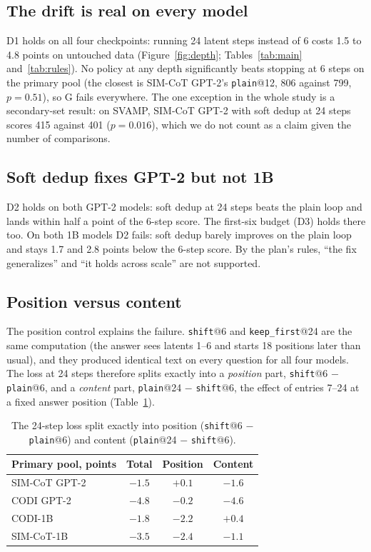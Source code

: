 \documentclass[11pt]{article}
\newcommand{\pol}[1]{\texttt{#1}}
\begin{document}
\subsection{The drift is real on every model}

D1 holds on all four checkpoints: running 24 latent steps instead of 6 costs 1.5 to 4.8 points on untouched data
(Figure~\ref{fig:depth}; Tables~\ref{tab:main} and~\ref{tab:rules}). No policy at any depth significantly beats stopping at
6 steps on the primary pool (the closest is SIM-CoT GPT-2's \pol{plain}@12, 806 against 799, $p = 0.51$), so G fails
everywhere. The one exception in the whole study is a secondary-set result: on SVAMP, SIM-CoT GPT-2 with soft dedup at 24
steps scores 415 against 401 ($p = 0.016$), which we do not count as a claim given the number of comparisons.

\subsection{Soft dedup fixes GPT-2 but not 1B}

D2 holds on both GPT-2 models: soft dedup at 24 steps beats the plain loop and lands within half a point of the 6-step score.
The first-six budget (D3) holds there too. On both 1B models D2 fails: soft dedup barely improves on the plain loop and stays
1.7 and 2.8 points below the 6-step score. By the plan's rules, ``the fix generalizes'' and ``it holds across scale'' are
not supported.

\subsection{Position versus content}
\label{sec:split}

The position control explains the failure. \pol{shift}@6 and \pol{keep\_first}@24 are the same computation (the answer sees
latents 1--6 and starts 18 positions later than usual), and they produced identical text on every question for all four
models. The loss at 24 steps therefore splits exactly into a \emph{position} part, \pol{shift}@6 $-$ \pol{plain}@6, and a
\emph{content} part, \pol{plain}@24 $-$ \pol{shift}@6, the effect of entries 7--24 at a fixed answer position
(Table~\ref{tab:split}).

\begin{table}[t]
\centering
\small
\setlength{\tabcolsep}{4pt}
\begin{tabular}{lccc}
\toprule
Primary pool, points & Total & Position & Content \\
\midrule
SIM-CoT GPT-2 & $-1.5$ & $+0.1$ & $-1.6$ \\
CODI GPT-2 & $-4.8$ & $-0.2$ & $-4.6$ \\
CODI-1B & $-1.8$ & $-2.2$ & $+0.4$ \\
SIM-CoT-1B & $-3.5$ & $-2.4$ & $-1.1$ \\
\bottomrule
\end{tabular}
\caption{The 24-step loss split exactly into position (\pol{shift}@6 $-$ \pol{plain}@6) and content (\pol{plain}@24 $-$
\pol{shift}@6).}
\label{tab:split}
\end{table}
\end{document}
